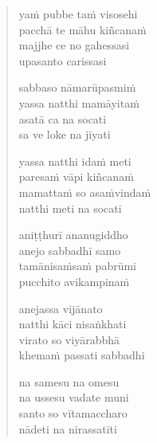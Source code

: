\clearpage
\begin{verse}

yaṁ pubbe taṁ visosehi\\
pacchā te māhu kiñcanaṁ\\
majjhe ce no gahessasi\\
upasanto carissasi

sabbaso nāmarūpasmiṁ\\
yassa natthi mamāyitaṁ\\
asatā ca na socati\\
sa ve loke na jīyati

yassa natthi idaṁ meti\\
paresaṁ vāpi kiñcanaṁ\\
mamattaṁ so asaṁvindaṁ\\
natthi meti na socati

aniṭṭhurī ananugiddho\\
anejo sabbadhī samo\\
tamānisaṁsaṁ pabrūmi\\
pucchito avikampinaṁ

anejassa vijānato\\
natthi kāci nisaṅkhati\\
virato so viyārabbhā\\
khemaṁ passati sabbadhi

na samesu na omesu\\
na ussesu vadate muni\\
santo so vītamaccharo\\
nādeti na nirassatīti

\end{verse}


